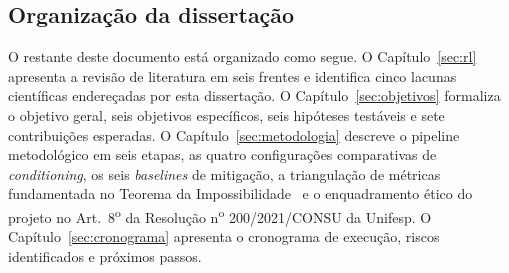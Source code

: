 \subsection{Organização da dissertação}
\label{sec:intro_organizacao}

O restante deste documento está organizado como segue. O Capítulo~\ref{sec:rl} apresenta a revisão de literatura em seis frentes e identifica cinco lacunas científicas endereçadas por esta dissertação. O Capítulo~\ref{sec:objetivos} formaliza o objetivo geral, seis objetivos específicos, seis hipóteses testáveis e sete contribuições esperadas. O Capítulo~\ref{sec:metodologia} descreve o pipeline metodológico em seis etapas, as quatro configurações comparativas de \emph{conditioning}, os seis \emph{baselines} de mitigação, a triangulação de métricas fundamentada no Teorema da Impossibilidade~\autocite{kleinberg2017inherent} e o enquadramento ético do projeto no Art.~8\textsuperscript{o} da Resolução n\textsuperscript{o} 200/2021/CONSU da Unifesp. O Capítulo~\ref{sec:cronograma} apresenta o cronograma de execução, riscos identificados e próximos passos.
